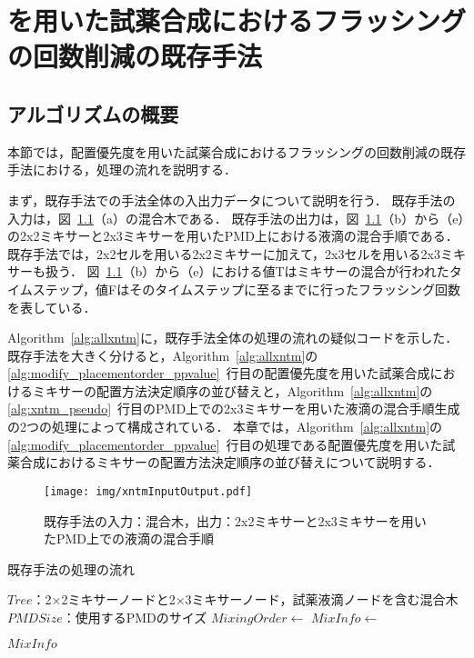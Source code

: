 \chapter{を用いた試薬合成におけるフラッシングの回数削減の既存手法}\label{sec:existing}

\section{アルゴリズムの概要}
本節では，配置優先度を用いた試薬合成におけるフラッシングの回数削減の既存手法における，処理の流れを説明する．

まず，既存手法での手法全体の入出力データについて説明を行う．
既存手法の入力は，図~\ref{fig:xntm}（a）の混合木である．
既存手法の出力は，図~\ref{fig:xntm}（b）から（e）の2x2ミキサーと2x3ミキサーを用いたPMD上における液滴の混合手順である．
既存手法では，2x2セルを用いる2x2ミキサーに加えて，2x3セルを用いる2x3ミキサーも扱う．
図~\ref{fig:xntm}（b）から（e）における値Tはミキサーの混合が行われたタイムステップ，値Fはそのタイムステップに至るまでに行ったフラッシング回数を表している．

Algorithm~\ref{alg:allxntm}に，既存手法全体の処理の流れの疑似コードを示した．
既存手法を大きく分けると，Algorithm~\ref{alg:allxntm}の\ref{alg:modify_placementorder_ppvalue}~行目の配置優先度を用いた試薬合成におけるミキサーの配置方法決定順序の並び替えと，Algorithm~\ref{alg:allxntm}の\ref{alg:xntm_pseudo}~行目のPMD上での2x3ミキサーを用いた液滴の混合手順生成の2つの処理によって構成されている．
本章では，Algorithm~\ref{alg:allxntm}の\ref{alg:modify_placementorder_ppvalue}~行目の処理である配置優先度を用いた試薬合成におけるミキサーの配置方法決定順序の並び替えについて説明する．

\begin{figure}[tbp]
 \centering\texttt{[image: img/xntmInputOutput.pdf]}
 \caption{既存手法の入力：混合木，出力：2x2ミキサーと2x3ミキサーを用いたPMD上での液滴の混合手順}\label{fig:xntm}
\end{figure}


\begin{algorithm}[tbp]
 \caption{既存手法の処理の流れ}\label{alg:allxntm}
 \begin{algorithmic}[1]
     \Require $\mathit{Tree}$：2$\times$2ミキサーノードと2$\times$3ミキサーノード，試薬液滴ノードを含む混合木
     \Require $\mathit{PMDSize}$：使用するPMDのサイズ
     \State $\mathit{MixingOrder} \gets$  \label{alg:modify_placementorder_ppvalue}
     \State $\mathit{MixInfo \gets}$  \label{alg:xntm_pseudo}

      \Return $\mathit{MixInfo}$
 \end{algorithmic}
\end{algorithm}

